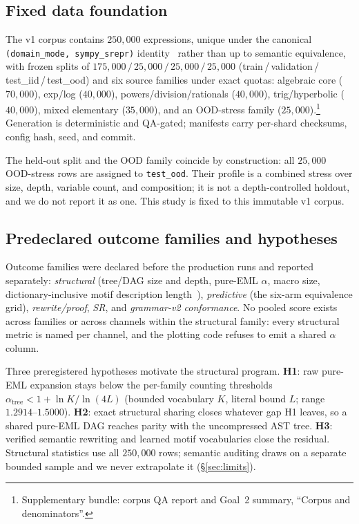 \documentclass[11pt]{article}
\newcommand{\anchor}[1]{\footnote{#1}}
\begin{document}
\subsection{Fixed data foundation}
\label{sec:corpus}
The v1 corpus contains $250{,}000$ expressions, unique under the canonical
\texttt{(domain\_mode, sympy\_srepr)} identity~\cite{meurer2017sympy} rather than
up to semantic equivalence, with frozen splits of
$175{,}000\,/\,25{,}000\,/\,25{,}000\,/\,25{,}000$
(train\,/\,validation\,/\,test\_iid\,/\,test\_ood) and six source families under
exact quotas: algebraic core ($70{,}000$), exp/log ($40{,}000$),
powers/division/rationals ($40{,}000$), trig/hyperbolic ($40{,}000$), mixed
elementary ($35{,}000$), and an OOD-stress family
($25{,}000$).\anchor{Supplementary bundle: corpus QA report and Goal~2
summary, ``Corpus and denominators''.}
Generation is deterministic and QA-gated; manifests carry per-shard checksums,
config hash, seed, and commit.

The held-out split and the OOD family coincide by construction: all $25{,}000$
OOD-stress rows are assigned to \texttt{test\_ood}. Their profile is a combined
stress over size, depth, variable count, and composition; it is not a
depth-controlled holdout, and we do not report it as one. This study is fixed to
this immutable v1 corpus.

\subsection{Predeclared outcome families and hypotheses}
Outcome families were declared before the production runs and reported
separately: \emph{structural} (tree/DAG size and depth, pure-EML $\alpha$, macro
size, dictionary-inclusive motif description length~\cite{rissanen1978}),
\emph{predictive} (the six-arm equivalence grid), \emph{rewrite/proof}, \emph{SR},
and \emph{grammar-v2 conformance}. No pooled score exists across families or
across channels within the structural family: every structural metric is named
per channel, and the plotting code refuses to emit a shared $\alpha$ column.

Three preregistered hypotheses motivate the structural program. \textbf{H1}: raw
pure-EML expansion stays below the per-family counting thresholds
$\alpha_{\text{tree}} < 1 + \ln K / \ln(4L)$ (bounded vocabulary $K$, literal
bound $L$; range $1.2914$--$1.5000$). \textbf{H2}: exact structural sharing closes
whatever gap H1 leaves, so a shared pure-EML DAG reaches parity with the
uncompressed AST tree. \textbf{H3}: verified semantic rewriting and learned motif
vocabularies close the residual. Structural statistics use all $250{,}000$ rows;
semantic auditing draws on a separate bounded sample and we never extrapolate it
(\S\ref{sec:limits}).
\end{document}
